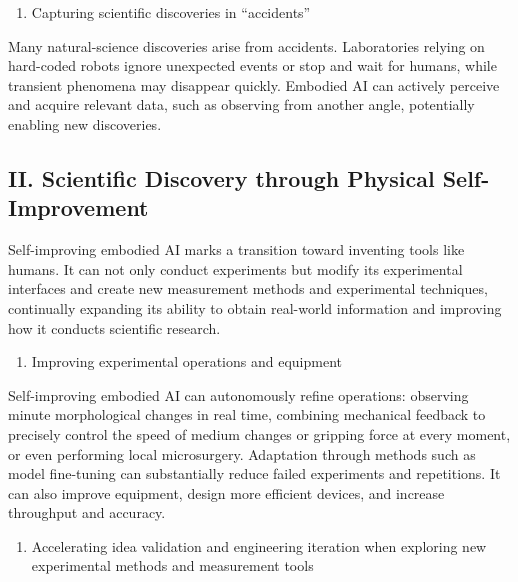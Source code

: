 \begin{enumerate}
\def\labelenumi{\arabic{enumi}.}
\setcounter{enumi}{4}
\tightlist
\item
  Capturing scientific discoveries in ``accidents''
\end{enumerate}

Many natural-science discoveries arise from accidents. Laboratories relying on hard-coded robots ignore unexpected events or stop and wait for humans, while transient phenomena may disappear quickly. Embodied AI can actively perceive and acquire relevant data, such as observing from another angle, potentially enabling new discoveries.

\hypertarget{ii.-scientific-discovery-through-physical-self-improvement}{%
\subsection{II. Scientific Discovery through Physical Self-Improvement}\label{ii.-scientific-discovery-through-physical-self-improvement}}

Self-improving embodied AI marks a transition toward inventing tools like humans. It can not only conduct experiments but modify its experimental interfaces and create new measurement methods and experimental techniques, continually expanding its ability to obtain real-world information and improving how it conducts scientific research.

\begin{enumerate}
\def\labelenumi{\arabic{enumi}.}
\tightlist
\item
  Improving experimental operations and equipment
\end{enumerate}

Self-improving embodied AI can autonomously refine operations: observing minute morphological changes in real time, combining mechanical feedback to precisely control the speed of medium changes or gripping force at every moment, or even performing local microsurgery. Adaptation through methods such as model fine-tuning can substantially reduce failed experiments and repetitions. It can also improve equipment, design more efficient devices, and increase throughput and accuracy.

\begin{enumerate}
\def\labelenumi{\arabic{enumi}.}
\setcounter{enumi}{1}
\tightlist
\item
  Accelerating idea validation and engineering iteration when exploring new experimental methods and measurement tools
\end{enumerate}

